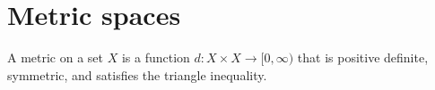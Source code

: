 \documentclass{article}
\begin{document}
\section{Metric spaces}
\begin{definition}
A metric on a set $X$ is a function $d\colon X\times X\to[0,\infty)$ that is
positive definite, symmetric, and satisfies the triangle inequality.
\end{definition}
\end{document}

